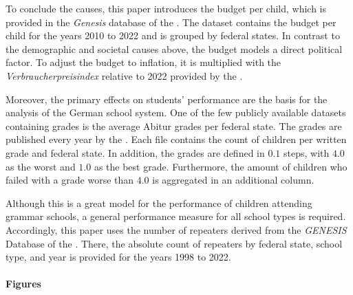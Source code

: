 To conclude the causes, this paper introduces the budget per child, which is provided in the \textit{Genesis} database of the \citeauthor{statistische_bundesamt_statistisches_2023}. The dataset contains the budget per child for the years 2010 to 2022 and is grouped by federal states. In contrast to the demographic and societal causes above, the budget models a direct political factor. To adjust the budget to inflation, it is multiplied with the \textit{Verbraucherpreisindex} relative to 2022 provided by the \citeauthor{statistische_bundesamt_statistisches_2023}. 


Moreover, the primary effects on students' performance are the basis for the analysis of the German school system. One of the few publicly available datasets containing grades is the average Abitur grades per federal state. The grades are published every year by the \citeauthor{kultusminister_konferenz_abiturnoten_nodate}. Each file contains the count of children per written grade and federal state. In addition, the grades are defined in $0.1$ steps, with $4.0$ as the worst and $1.0$ as the best grade. Furthermore, the amount of children who failed with a grade worse than $4.0$ is aggregated in an additional column. 

Although this is a great model for the performance of children attending grammar schools, a general performance measure for all school types is required. Accordingly, this paper uses the number of repeaters derived from the \textit{{GENESIS}} Database of the \citeauthor{statistische_bundesamt_statistisches_2023}. There, the absolute count of repeaters by federal state, school type, and year is provided for the years 1998 to 2022.

\paragraph{Figures}

